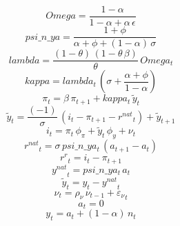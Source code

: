 \begin{dmath*}
Omega = \frac{1-{{\alpha}}}{1-{{\alpha}}+{{\alpha}}\, {{\epsilon}}}
\end{dmath*}
\begin{dmath*}
psi\_n\_ya = \frac{1+{{\phi}}}{{{\alpha}}+{{\phi}}+\left(1-{{\alpha}}\right)\, {{\sigma}}}
\end{dmath*}
\begin{dmath*}
lambda = \frac{\left(1-{{\theta}}\right)\, \left(1-{{\theta}}\, {{\beta}}\right)}{{{\theta}}}\, {Omega_{t}}
\end{dmath*}
\begin{dmath*}
kappa = {lambda_{t}}\, \left({{\sigma}}+\frac{{{\alpha}}+{{\phi}}}{1-{{\alpha}}}\right)
\end{dmath*}
\begin{dmath}
{{\pi}_{t}}={{\beta}}\, {{\pi}_{t+1}}+{kappa_{t}}\, {{\tilde y}_{t}}
\end{dmath}
\begin{dmath}
{{\tilde y}_{t}}=\frac{\left(-1\right)}{{{\sigma}}}\, \left({{i}_{t}}-{{\pi}_{t+1}}-{{r^{nat}}_{t}}\right)+{{\tilde y}_{t+1}}
\end{dmath}
\begin{dmath}
{{i}_{t}}={{\pi}_{t}}\, {{\phi_{\pi}}}+{{\tilde y}_{t}}\, {{\phi_{y}}}+{{\nu}_{t}}
\end{dmath}
\begin{dmath}
{{r^{nat}}_{t}}={{\sigma}}\, {psi\_n\_ya_{t}}\, \left({{a}_{t+1}}-{{a}_{t}}\right)
\end{dmath}
\begin{dmath}
{{r^r}_{t}}={{i}_{t}}-{{\pi}_{t+1}}
\end{dmath}
\begin{dmath}
{{y^{nat}}_{t}}={psi\_n\_ya_{t}}\, {{a}_{t}}
\end{dmath}
\begin{dmath}
{{\tilde y}_{t}}={{y}_{t}}-{{y^{nat}}_{t}}
\end{dmath}
\begin{dmath}
{{\nu}_{t}}={{\rho_{\nu}}}\, {{\nu}_{t-1}}+{{\varepsilon_\nu}_{t}}
\end{dmath}
\begin{dmath}
{{a}_{t}}=0
\end{dmath}
\begin{dmath}
{{y}_{t}}={{a}_{t}}+\left(1-{{\alpha}}\right)\, {{n}_{t}}
\end{dmath}
